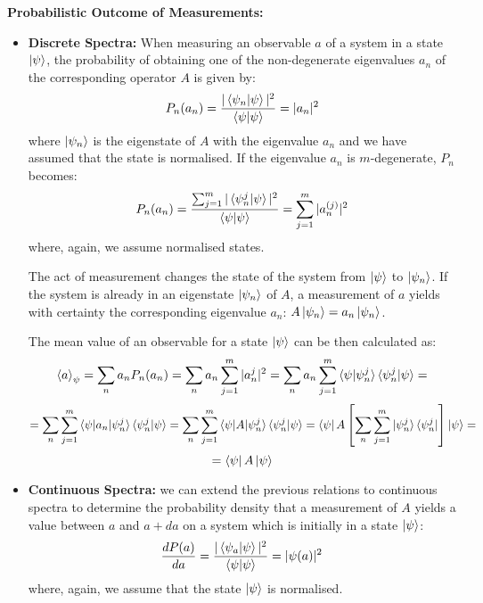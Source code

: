 \begin{postulate} \label{post_4}
    \textbf{Probabilistic Outcome of Measurements:}
    \begin{itemize}
        \item \textbf{Discrete Spectra:} When measuring an observable $a$ of a system in a state $\ket{\psi}$, the probability of obtaining one of the non-degenerate eigenvalues $a_n$ of the corresponding operator $A$ is given by:
        \begin{equation}
            P_n(a_n) = \frac{|\braket{\psi_n|\psi}|^2}{\braket{\psi|\psi}} = |a_n|^2
        \end{equation}
        where $\ket{\psi_n}$ is the eigenstate of $A$ with the eigenvalue $a_n$ and we have assumed that the state is normalised. If the eigenvalue $a_n$ is $m$-degenerate, $P_n$ becomes:
        \begin{equation}
            P_n(a_n) = \frac{\sum_{j=1}^m|\braket{\psi_n^j|\psi}|^2}{\braket{\psi|\psi}} = \sum_{j=1}^m |a_n^{(j)}|^2
        \end{equation}
        where, again, we assume normalised states.
        
        The act of measurement changes the state of the system from $\ket{\psi}$ to $\ket{\psi_n}$. If the system is already in an eigenstate $\ket{\psi_n}$ of $A$, a measurement of $a$ yields with certainty the corresponding eigenvalue $a_n$: $A\ket{\psi_n} = a_n\ket{\psi_n}$.

        The mean value of an observable for a state $\ket{\psi}$ can be then calculated as:
        \begin{equation*}
            \braket{a}_\psi = \sum_n a_n P_n(a_n) = \sum_n a_n \sum_{j=1}^m |a_n^j|^2 = \sum_n a_n \sum_{j=1}^m \braket{\psi|\psi_n^j}\braket{\psi_n^j|\psi} = 
        \end{equation*}
        \begin{equation*}
            = \sum_n \sum_{j=1}^m \braket{\psi|a_n|\psi_n^j}\braket{\psi_n^j|\psi} = \sum_n \sum_{j=1}^m \braket{\psi|A|\psi_n^j}\braket{\psi_n^j|\psi} = \bra{\psi}A \left[\sum_n \sum_{j=1}^m \ket{\psi_n^j}\bra{\psi_n^j}\right]\ket{\psi} =
        \end{equation*}
        \begin{equation}
            = \bra{\psi}A\ket{\psi}
        \end{equation}

        \item \textbf{Continuous Spectra:} we can extend the previous relations to continuous spectra to determine the probability density that a measurement of $A$ yields a value between $a$ and $a + da$ on a system which is initially in a state $\ket{\psi}$:
        \begin{equation}
            \frac{dP(a)}{da} = \frac{|\braket{\psi_a|\psi}|^2}{\braket{\psi|\psi}} = |\psi(a)|^2
        \end{equation}
        where, again, we assume that the state $\ket{\psi}$ is normalised. 
        

\end{itemize}
\end{postulate}
